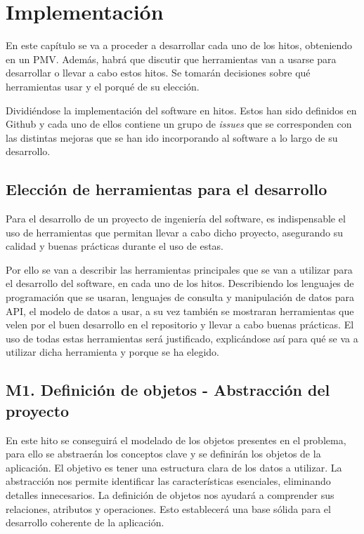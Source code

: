 \chapter{Implementación}

En este capítulo se va a proceder a desarrollar cada uno de los hitos, obteniendo en un PMV. Además, 
habrá que discutir que herramientas van a usarse para desarrollar o llevar a cabo estos hitos. Se 
tomarán decisiones sobre qué herramientas usar y el porqué de su elección. 

Dividiéndose la implementación del software en hitos. Estos han sido definidos en Github
y cada uno de ellos contiene un grupo de \textit{issues} que se corresponden con las distintas
mejoras que se han ido incorporando al software a lo largo de su desarrollo.\\

\section{Elección de herramientas para el desarrollo}

Para el desarrollo de un proyecto de ingeniería del software, es indispensable el uso de herramientas 
que permitan llevar a cabo dicho proyecto, asegurando su calidad y buenas prácticas durante el uso de 
estas.

Por ello se van a describir las herramientas principales que se van a utilizar para el desarrollo del 
software, en cada uno de los hitos. Describiendo los lenguajes de programación que se usaran, lenguajes 
de consulta y manipulación de datos para API, el modelo de datos a usar, a su vez también se mostraran 
herramientas que velen por el buen desarrollo en el repositorio y llevar a cabo buenas prácticas. El 
uso de todas estas herramientas será justificado, explicándose así para qué se va a utilizar dicha 
herramienta y porque se ha elegido.

\section{M1. Definición de objetos - Abstracción del proyecto}

En este hito se conseguirá el modelado de los objetos presentes en el problema, para ello se abstraerán 
los conceptos clave y se definirán los objetos de la aplicación. El objetivo es tener una estructura 
clara de los datos a utilizar. La abstracción nos permite identificar las características esenciales, 
eliminando detalles innecesarios. La definición de objetos nos ayudará a comprender sus relaciones, 
atributos y operaciones. Esto establecerá una base sólida para el desarrollo coherente de la aplicación.

